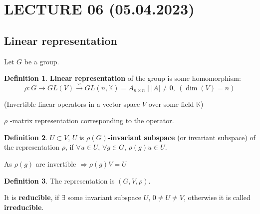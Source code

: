 \documentclass[12pt, a4paper]{article}
\theoremstyle{definition}
\newtheorem{definition}{Definition}[section]
\begin{document}
\section{LECTURE 06 (05.04.2023)}
\subsection{Linear representation}
Let $G$ be a group.
\par
\begin{definition}
    \textbf{Linear representation} of the group is some homomorphism:
    \[\rho: G\rightarrow GL(V)\stackrel{\backsim }{\rightarrow} GL(n,\mathbb{K})={A_{n\times
    n}\mid |A| \neq 0},\ (\dim (V)=n)\]
    \par
    (Invertible linear operators in a vector space $V$ over some field $\mathbb{K}$)
    \par
    $\rho$ -matrix representation corresponding to the operator.
\end{definition}
\begin{definition}
    $U \subset V$, $U$ is $\rho(G)$\textbf{-invariant subspace} (or invariant subspace) of the
    representation $\rho$, if $\forall u\in U $, $\forall g \in G $, $\rho(g)u \in U $.
\end{definition}
\par
As $\rho(g)$ are invertible $\Rightarrow \rho(g)V = U$
\begin{definition}
    The representation is $(G, V, \rho)$.
    \par
    It is \textbf{reducible}, if $\exists$ some invariant subspace $U$, ${0} \neq U \neq V $,
    otherwise it is called \textbf{irreducible}.
\end{definition}
\end{document}
